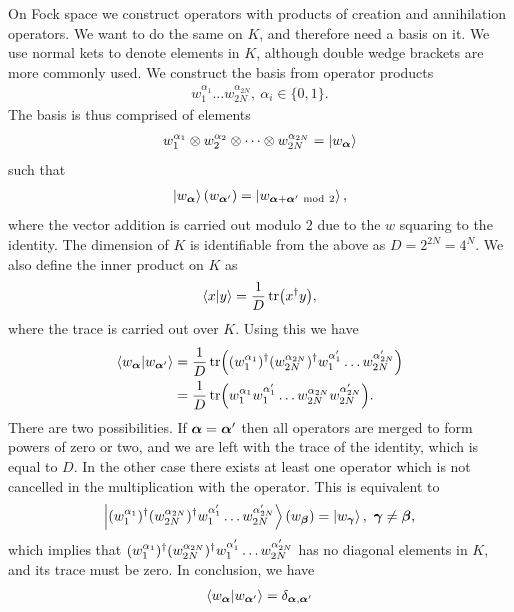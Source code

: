 On Fock space we construct operators with products of creation and annihilation operators. We want to do the same on $K$, and therefore need a basis on it. We use normal kets to denote elements in $K$, although double wedge brackets are more commonly used. We construct the basis from operator products
\begin{align*}
	w_{1}^{\alpha_{1}}\dots w_{2N}^{\alpha_{2N}},\ \alpha_{i}\in\{0, 1\}.
\end{align*}
The basis is thus comprised of elements
\begin{align*}
	w_{1}^{\alpha_{1}}\otimes w_{2}^{\alpha_{2}}\otimes\dots\otimes w_{2N}^{\alpha_{2N}} = \ket{w_{\vb*{\alpha}}}
\end{align*}
such that
\begin{align*}
	\ket{w_{\vb*{\alpha}}}(w_{\vb*{\alpha}^{\prime}}) = \ket{w_{\vb*{\alpha} + \vb*{\alpha}^{\prime}\ \text{mod}\  2}},
\end{align*}
where the vector addition is carried out modulo $2$ due to the $w$ squaring to the identity. The dimension of $K$ is identifiable from the above as $D = 2^{2N} = 4^{N}$. We also define the inner product on $K$ as
\begin{align*}
	\braket{x}{y} = \frac{1}{D}\tr(x^{\dagger} y),
\end{align*}
where the trace is carried out over $K$. Using this we have
\begin{align*}
	\braket{w_{\vb*{\alpha}}}{w_{\vb*{\alpha}^{\prime}}} &= \frac{1}{D}\tr((w_{1}^{\alpha_{1}})^{\dagger} (w_{2N}^{\alpha_{2N}})^{\dagger} w_{1}^{\alpha_{1}^{\prime}}\dots w_{2N}^{\alpha_{2N}^{\prime}}) \\
	                                              &= \frac{1}{D}\tr(w_{1}^{\alpha_{1}}w_{1}^{\alpha_{1}^{\prime}}\dots w_{2N}^{\alpha_{2N}}w_{2N}^{\alpha_{2N}^{\prime}}).
\end{align*}
There are two possibilities. If $\vb*{\alpha} = \vb*{\alpha}^{\prime}$ then all operators are merged to form powers of zero or two, and we are left with the trace of the identity, which is equal to $D$. In the other case there exists at least one operator which is not cancelled in the multiplication with the operator. This is equivalent to
\begin{align*}
	\ket{(w_{1}^{\alpha_{1}})^{\dagger} (w_{2N}^{\alpha_{2N}})^{\dagger} w_{1}^{\alpha_{1}^{\prime}}\dots w_{2N}^{\alpha_{2N}^{\prime}}}(w_{\vb*{\beta}}) = \ket{w_{\vb*{\gamma}}},\ \vb*{\gamma} \neq \vb*{\beta},
\end{align*}
which implies that $(w_{1}^{\alpha_{1}})^{\dagger} (w_{2N}^{\alpha_{2N}})^{\dagger} w_{1}^{\alpha_{1}^{\prime}}\dots w_{2N}^{\alpha_{2N}^{\prime}}$ has no diagonal elements in $K$, and its trace must be zero. In conclusion, we have
\begin{align*}
	\braket{w_{\vb*{\alpha}}}{w_{\vb*{\alpha}^{\prime}}} = \delta_{\vb*{\alpha}, \vb*{\alpha}^{\prime}}
\end{align*}

